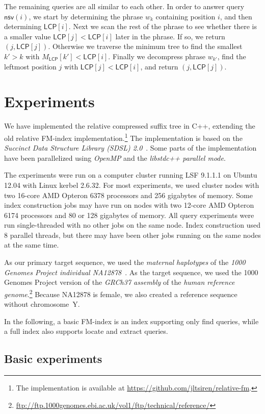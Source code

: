 \documentclass[a4paper,11pt]{llncs}
\newcommand{\mLCP}{\ensuremath{\mathsf{LCP}}}
\newcommand{\find}{\textsf{find}}
\newcommand{\locate}{\textsf{locate}}
\newcommand{\extract}{\textsf{extract}}
\newcommand{\mnsv}{\ensuremath{\mathsf{nsv}}}
\begin{document}
The remaining queries are all similar to each other. In order to answer query $\mnsv(i)$, we start by determining the phrase $w_{k}$ containing position $i$, and then determining $\mLCP[i]$. Next we scan the rest of the phrase to see whether there is a smaller value $\mLCP[j] < \mLCP[i]$ later in the phrase. If so, we return $(j,\mLCP[j])$. Otherwise we traverse the minimum tree to find the smallest $k' > k$ with $M_{\mLCP}[k'] < \mLCP[i]$. Finally we decompress phrase $w_{k'}$, find the leftmost position $j$ with $\mLCP[j] < \mLCP[i]$, and return $(j,\mLCP[j])$.


\section{Experiments}

We have implemented the relative compressed suffix tree in C++, extending the old relative FM-index implementation.\footnote{The implementation is available at \url{https://github.com/jltsiren/relative-fm}.} The implementation is based on the \emph{Succinct Data Structure Library (SDSL) 2.0}~\cite{Gog2014b}. Some parts of the implementation have been parallelized using \emph{OpenMP} and the \emph{libstdc++ parallel mode}.

The experiments were run on a computer cluster running LSF 9.1.1.1 on Ubuntu 12.04 with Linux kerbel 2.6.32. For most experiments, we used cluster nodes with two 16-core AMD Opteron 6378 processors and 256 gigabytes of memory. Some index construction jobs may have run on nodes with two 12-core AMD Opteron 6174 processors and 80 or 128 gigabytes of memory. All query experiments were run single-threaded with no other jobs on the same node. Index construction used 8 parallel threads, but there may have been other jobs running on the same nodes at the same time.

As our primary target sequence, we used the \emph{maternal haplotypes} of the \emph{1000 Genomes Project individual NA12878}~\cite{Rozowsky2011}. As the target sequence, we used the 1000 Genomes Project version of the \emph{GRCh37 assembly} of the \emph{human reference genome}.\footnote{\url{ftp://ftp.1000genomes.ebi.ac.uk/vol1/ftp/technical/reference/}} Because NA12878 is female, we also created a reference sequence without chromosome~Y.

In the following, a basic FM-index is an index supporting only \find{} queries, while a full index also supports \locate{} and \extract{} queries.

\subsection{Basic experiments}
\end{document}
